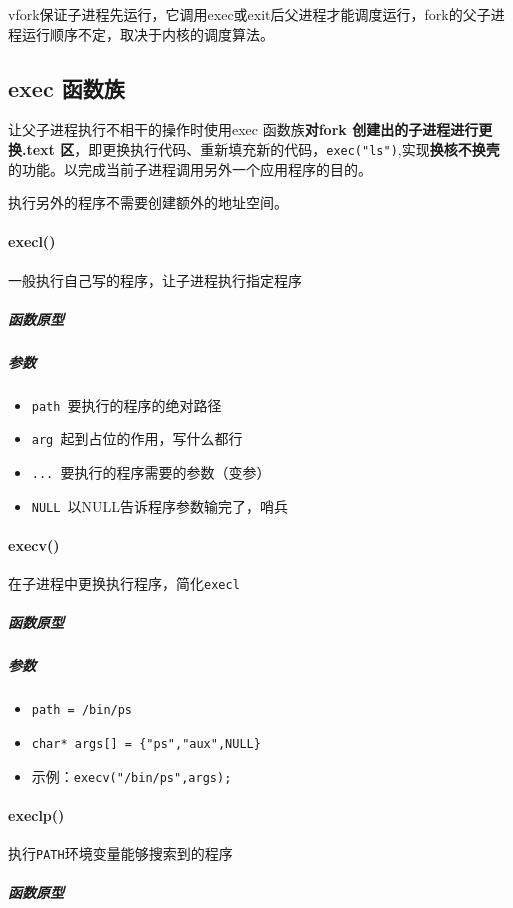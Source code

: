 \documentclass[UTF8,a4paper,12pt]{ctexbook}
\begin{document}
				vfork保证子进程先运行，它调用exec或exit后父进程才能调度运行，fork的父子进程运行顺序不定，取决于内核的调度算法。
				
		\subsection{exec 函数族}
			让父子进程执行不相干的操作时使用exec 函数族\textbf{对fork 创建出的子进程进行更换.text 区}，即更换执行代码、重新填充新的代码，\verb|exec("ls")|,实现\textbf{换核不换壳}的功能。以完成当前子进程调用另外一个应用程序的目的。
			
			执行另外的程序不需要创建额外的地址空间。
			
			\paragraph{execl()}一般执行自己写的程序，让子进程执行指定程序
					\subparagraph{函数原型}
					
					\subparagraph{参数}
						\begin{itemize}[itemindent = 1em]
							\item \verb|path |要执行的程序的绝对路径
							\item \verb|arg |起到占位的作用，写什么都行
							\item \verb|... |要执行的程序需要的参数（变参）
							\item \verb|NULL |以NULL告诉程序参数输完了，哨兵
						\end{itemize}
			
			\paragraph{execv()}在子进程中更换执行程序，简化\verb|execl|
					\subparagraph{函数原型}
					
					\subparagraph{参数}
						\begin{itemize}[itemindent = 1em]
							\item \verb|path = /bin/ps|
							\item \verb|char* args[] = {"ps","aux",NULL}|
							\item 示例：\verb|execv("/bin/ps",args);|
						\end{itemize}		
			
			\paragraph{execlp()}执行\verb|PATH|环境变量能够搜索到的程序
					\subparagraph{函数原型}
					
\end{document}
